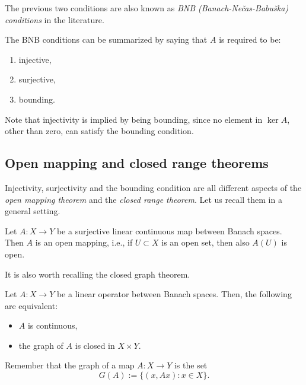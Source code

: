 The previous two conditions are also known as \emph{BNB (Banach-Ne\v{c}as-Babu\v{s}ka) conditions} in the literature.
\begin{remark}\label{rmk:bnb_conditions}
	The BNB conditions can be summarized by saying that $A$ is required to be:
	\begin{enumerate}
		\item injective,
		\item surjective,
		\item bounding.
	\end{enumerate}
	Note that injectivity is implied by being bounding, since no element in $\ker A$, other than zero, can satisfy the bounding condition.
\end{remark}


\subsection{Open mapping and closed range theorems}

Injectivity, surjectivity and the bounding condition are all different aspects of the \emph{open mapping theorem} and the \emph{closed range theorem}. Let us recall them in a general setting.

\begin{theorem}\label{thm:open_mapping}
	Let $A: X \to Y$ be a surjective linear continuous map between Banach spaces. Then $A$ is an open mapping, i.e., if $U \subset X$ is an open set, then also $A(U)$ is open.
\end{theorem}

It is also worth recalling the closed graph theorem.
\begin{theorem}\label{thm:closed_graph}
	Let $A: X \to Y$ be a linear operator between Banach spaces. Then, the following are equivalent:
	\begin{itemize}
		\item $A$ is continuous,
		\item the graph of $A$ is closed in $X \times Y$.
	\end{itemize}
\end{theorem}
Remember that the graph of a map $A: X \to Y$ is the set
\[
G(A) := \{(x,Ax) : x \in X\}.
\]


